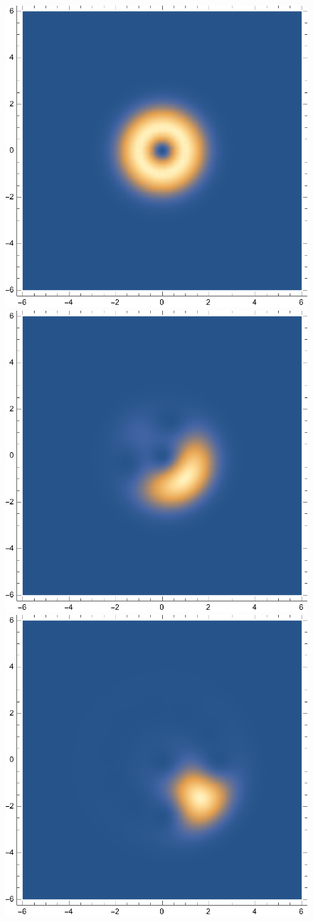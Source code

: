\documentclass{article}
\theoremstyle{definition}
\begin{document}
\begin{enumerate}[label=\alph*)]
	\begin{figure}[!htb]
	\centering
	\begin{minipage}{.24\textwidth}
  	\centering
  	\includegraphics[width=.7\linewidth]{figures/3-N-1.eps}
	\end{minipage}%
	\begin{minipage}{.24\textwidth}
  	\centering
  	\includegraphics[width=.7\linewidth]{figures/3-N-3.eps}
	\end{minipage}
	\begin{minipage}{.24\textwidth}
  	\centering
  	\includegraphics[width=.7\linewidth]{figures/3-N-10.eps}

\end{minipage}
\end{figure}
\end{enumerate}
\end{document}
